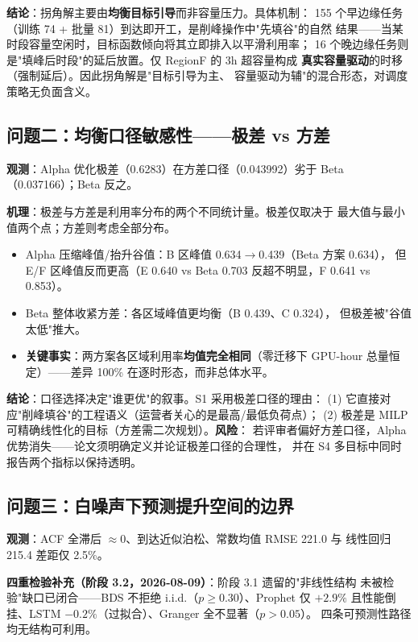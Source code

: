 \documentclass{internal-report}
\begin{document}
\textbf{结论}：拐角解主要由\textbf{均衡目标引导}而非容量压力。具体机制：
155 个早边缘任务（训练 74 + 批量 81）到达即开工，是削峰操作中"先填谷"的自然
结果——当某时段容量空闲时，目标函数倾向将其立即排入以平滑利用率；
16 个晚边缘任务则是"填峰后时段"的延后放置。仅 RegionF 的 3h 超容量构成
\textbf{真实容量驱动}的时移（强制延后）。因此拐角解是"目标引导为主、
容量驱动为辅"的混合形态，对调度策略无负面含义。

\subsection{问题二：均衡口径敏感性——极差 vs 方差}

\textbf{观测}：Alpha 优化极差（0.6283）在方差口径（0.043992）劣于 Beta
（0.037166）；Beta 反之。

\textbf{机理}：极差与方差是利用率分布的两个不同统计量。极差仅取决于
最大值与最小值两个点；方差则考虑全部分布。
\begin{itemize}
  \item Alpha 压缩峰值/抬升谷值：B 区峰值 0.634$\to$0.439（Beta 方案 0.634），
        但 E/F 区峰值反而更高（E 0.640 vs Beta 0.703 反超不明显，F 0.641 vs 0.853）。
  \item Beta 整体收紧方差：各区域峰值更均衡（B 0.439、C 0.324），
        但极差被"谷值太低"推大。
  \item \textbf{关键事实}：两方案各区域利用率\textbf{均值完全相同}（零迁移下
        GPU-hour 总量恒定）——差异 100\% 在逐时形态，而非总体水平。
\end{itemize}

\textbf{结论}：口径选择决定"谁更优"的叙事。S1 采用极差口径的理由：
(1) 它直接对应"削峰填谷"的工程语义（运营者关心的是最高/最低负荷点）；
(2) 极差是 MILP 可精确线性化的目标（方差需二次规划）。\textbf{风险}：
若评审者偏好方差口径，Alpha 优势消失——论文须明确定义并论证极差口径的合理性，
并在 S4 多目标中同时报告两个指标以保持透明。

\subsection{问题三：白噪声下预测提升空间的边界}

\textbf{观测}：ACF 全滞后 $\approx0$、到达近似泊松、常数均值 RMSE 221.0 与
线性回归 215.4 差距仅 2.5\%。

\textbf{四重检验补充（阶段 3.2，2026-08-09）}：阶段 3.1 遗留的"非线性结构
未被检验"缺口已闭合——BDS 不拒绝 i.i.d.（$p\ge0.30$）、Prophet 仅 $+2.9\%$
且性能倒挂、LSTM $-0.2\%$（过拟合）、Granger 全不显著（$p>0.05$）。
四条可预测性路径均无结构可利用。
\end{document}
